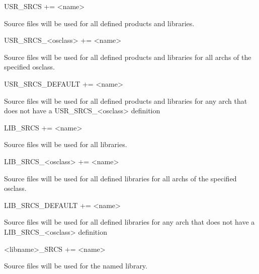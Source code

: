 \begin{description}\item {}USR\_SRCS += \textless{}name\textgreater{}

\end{description}Source files will be used for all defined products and libraries.

\begin{description}\item USR\_SRCS\_\textless{}osclass\textgreater{} += \textless{}name\textgreater{}

\end{description}Source files will be used for all defined products and libraries for all archs of the specified osclass.

\begin{description}\item USR\_SRCS\_DEFAULT += \textless{}name\textgreater{}

\end{description}Source files will be used for all defined products and libraries for any arch that does not have a 
USR\_SRCS\_\textless{}osclass\textgreater{} definition



\begin{description}\item {}LIB\_SRCS += \textless{}name\textgreater{}

\end{description}Source files will be used for all libraries.

\begin{description}\item LIB\_SRCS\_\textless{}osclass\textgreater{} += \textless{}name\textgreater{}

\end{description}Source files will be used for all defined libraries for all archs of the specified osclass.

\begin{description}\item LIB\_SRCS\_DEFAULT += \textless{}name\textgreater{}

\end{description}Source files will be used for all defined libraries for any arch that does not have a LIB\_SRCS\_\textless{}osclass\textgreater{} 
definition



\begin{description}\item \textless{}libname\textgreater{}\_SRCS += \textless{}name\textgreater{}

\end{description}Source files will be used for the named library.

